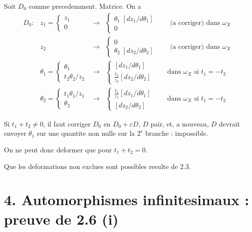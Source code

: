 \documentclass[11pt,a4paper]{article}
\theoremstyle{plain}
\theoremstyle{definition}
\begin{document}
Soit $D_0$ comme precedemment. Matrice. On a
\[
\begin{array}{llll}
D_0 : & z_1 = \begin{cases} z_1 \\ 0 \end{cases} & \longrightarrow & \begin{cases} \theta_1 \; [dz_1/d\theta_1] \\ 0 \end{cases} \qquad \text{(a corriger) dans } \omega_X \\
& z_2 & \longrightarrow & \begin{cases} 0 \\ \theta_2 \; [dz_2/d\theta_2] \end{cases} \qquad \text{(a corriger) dans } \omega_X \\
& \theta_1 = \begin{cases} \theta_1 \\ t_2 \theta_2/z_2 \end{cases} & \longrightarrow & \begin{cases} [dz_1/d\theta_1] \\ \frac{t_2}{z_2} [dz_2/d\theta_2] \end{cases} \qquad \text{dans } \omega_X \text{ si } t_1 = -t_2 \\
& \theta_2 = \begin{cases} t_1 \theta_1/z_1 \\ \theta_2 \end{cases} & \longrightarrow & \begin{cases} \frac{t_1}{z_1} [dz_1/d\theta_1] \\ [dz_2/d\theta_2] \end{cases} \qquad \text{dans } \omega_X \text{ si } t_1 = -t_2
\end{array}
\]

Si $t_1 + t_2 \neq 0$, il faut corriger $D_0$ en $D_0 + \varepsilon D$, $D$ pair, et, a nouveau, $D$ devrait envoyer $\theta_1$ sur une quantite non nulle sur la $2^{\text{e}}$ branche : impossible.

On ne peut donc deformer que pour $t_1 + t_2 = 0$.

Que les deformations non exclues sont possibles resulte de 2.3.

\newpage

\section*{4. Automorphismes infinitesimaux : preuve de 2.6 (i)}
\end{document}
